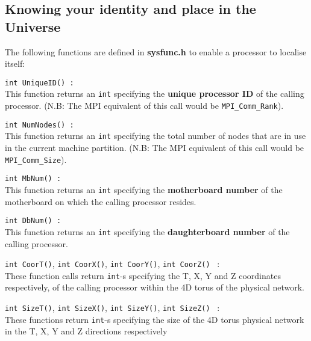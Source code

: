 \subsection{Knowing your identity and place in the Universe}
The following functions are defined in {\bf sysfunc.h} to enable
a processor to localise itself:
\begin{description}
\item{\tt int UniqueID()\ : \\}
This function returns an {\tt int} specifying 
the {\bf unique processor ID} of the calling
processor. (N.B: The MPI equivalent of this call
would be {\tt MPI\_Comm\_Rank}).
\item{\tt int NumNodes()\ : \\}
This function returns an {\tt int} specifying 
the total number of nodes
that are in use in the current machine partition.
(N.B: The MPI equivalent of this call would be {\tt MPI\_Comm\_Size}).
\item{\tt int MbNum()\ : \\}
This function returns an {\tt int} specifying the {\bf motherboard number}
of the motherboard on which the calling processor resides.
\item{\tt int DbNum()\ : \\}
This function returns an {\tt int} specifying the {\bf daughterboard number}
of the calling processor.
\item{{\tt int CoorT()}, {\tt int CoorX()}, {\tt int CoorY()}, {\tt int CoorZ()} \ : \\}
These function calls return {\tt int}-s specifying the T, X, Y and Z coordinates respectively, of the calling processor within the 4D torus of the physical
network.
\item{{\tt int SizeT()}, {\tt int SizeX()}, {\tt int SizeY()}, {\tt int SizeZ()} \ : \\} 
These functions return {\tt int}-s specifying the size of the 4D torus physical
network in the T, X, Y and Z directions respectively
\end{description}


